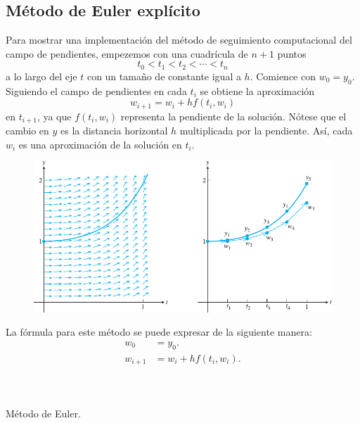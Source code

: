 \subsection{Método de Euler explícito}

Para mostrar una implementación del método de seguimiento
computacional del campo de pendientes, empezemos con una cuadrícula
de $n+1$ puntos
\begin{equation*}
    t_{0}<t_{1}<t_{2}<\cdots<t_{n}
\end{equation*}
a lo largo del eje $t$ con un tamaño de constante igual a $h$.
Comience con $w_{0}=y_{0}$.
Siguiendo el campo de pendientes en cada $t_{i}$ se obtiene la
aproximación
\begin{equation*}
    w_{i+1}=w_{i}+hf\left(t_{i},w_{i}\right)
\end{equation*}
en $t_{i+1}$, ya que $f\left(t_{i},w_{i}\right)$ representa la
pendiente de la solución.
Nótese que el cambio en $y$ es la distancia horizontal $h$
multiplicada por la pendiente.
Así, cada $w_{i}$ es una aproximación de la solución en $t_{i}$.

\begin{figure}[ht!]
    \centering
    \includegraphics[width=.6\paperwidth]{eulermethod}
\end{figure}

La fórmula para este método se puede expresar de la siguiente manera:
\begin{align*}
    w_{0}   & =y_{0}.                            \\
    w_{i+1} & =w_{i}+hf\left(t_{i},w_{i}\right).
\end{align*}

\begin{listing}[ht!]
    \tiny
    \centering
    \inputminted[linenos,highlightlines={6-17}]{octave}{euler1.m}
    \inputminted[linenos,highlightlines={1-6}]{octave}{eulerstep.m}
    \inputminted[linenos,highlightlines={1-4}]{octave}{ydot.m}
    \caption{Método de Euler.}
\end{listing}

